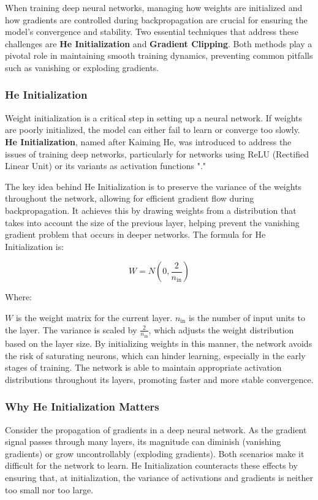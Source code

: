 When training deep neural networks, managing how weights are initialized and how gradients are controlled during backpropagation are crucial for ensuring the model's convergence and stability. Two essential techniques that address these challenges are \textbf{He Initialization} and \textbf{Gradient Clipping}. Both methods play a pivotal role in maintaining smooth training dynamics, preventing common pitfalls such as vanishing or exploding gradients.

\subsubsection*{He Initialization}

Weight initialization is a critical step in setting up a neural network. If weights are poorly initialized, the model can either fail to learn or converge too slowly. \textbf{He Initialization}, named after Kaiming He, was introduced to address the issues of training deep networks, particularly for networks using ReLU (Rectified Linear Unit) or its variants as activation functions "\cite{he2015delvingdeeprectifierssurpassing}."

The key idea behind He Initialization is to preserve the variance of the weights throughout the network, allowing for efficient gradient flow during backpropagation. It achieves this by drawing weights from a distribution that takes into account the size of the previous layer, helping prevent the vanishing gradient problem that occurs in deeper networks. The formula for He Initialization is:

\[W = N(0, \frac{2}{n_{\text{in}}})\]

Where:

$W$ is the weight matrix for the current layer.
$n_{\text{in}}$ is the number of input units to the layer.
The variance is scaled by $\frac{2}{n_{\text{in}}}$, which adjusts the weight distribution based on the layer size.
By initializing weights in this manner, the network avoids the risk of saturating neurons, which can hinder learning, especially in the early stages of training. The network is able to maintain appropriate activation distributions throughout its layers, promoting faster and more stable convergence.

\subsubsection*{Why He Initialization Matters}

Consider the propagation of gradients in a deep neural network. As the gradient signal passes through many layers, its magnitude can diminish (vanishing gradients) or grow uncontrollably (exploding gradients). Both scenarios make it difficult for the network to learn. He Initialization counteracts these effects by ensuring that, at initialization, the variance of activations and gradients is neither too small nor too large.

